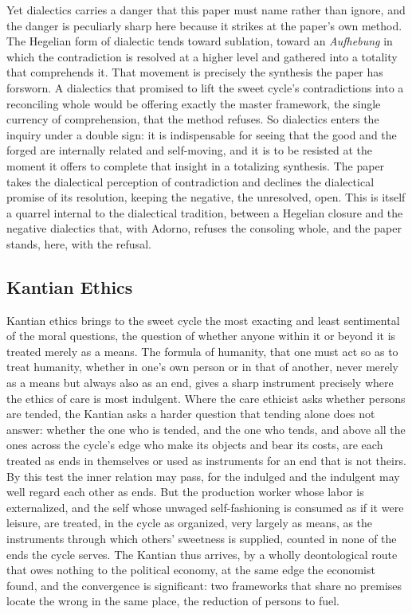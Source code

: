 \documentclass[11pt,a4paper]{article}
\begin{document}
Yet dialectics carries a danger that this paper must name rather than ignore, and the danger is peculiarly sharp here because it strikes at the paper's own method. The Hegelian form of dialectic tends toward sublation, toward an \textit{Aufhebung} in which the contradiction is resolved at a higher level and gathered into a totality that comprehends it. That movement is precisely the synthesis the paper has forsworn. A dialectics that promised to lift the sweet cycle's contradictions into a reconciling whole would be offering exactly the master framework, the single currency of comprehension, that the method refuses. So dialectics enters the inquiry under a double sign: it is indispensable for seeing that the good and the forged are internally related and self-moving, and it is to be resisted at the moment it offers to complete that insight in a totalizing synthesis. The paper takes the dialectical perception of contradiction and declines the dialectical promise of its resolution, keeping the negative, the unresolved, open. This is itself a quarrel internal to the dialectical tradition, between a Hegelian closure and the negative dialectics that, with Adorno, refuses the consoling whole, and the paper stands, here, with the refusal.

\subsection{Kantian Ethics}

Kantian ethics brings to the sweet cycle the most exacting and least sentimental of the moral questions, the question of whether anyone within it or beyond it is treated merely as a means. The formula of humanity, that one must act so as to treat humanity, whether in one's own person or in that of another, never merely as a means but always also as an end, gives a sharp instrument precisely where the ethics of care is most indulgent. Where the care ethicist asks whether persons are tended, the Kantian asks a harder question that tending alone does not answer: whether the one who is tended, and the one who tends, and above all the ones across the cycle's edge who make its objects and bear its costs, are each treated as ends in themselves or used as instruments for an end that is not theirs. By this test the inner relation may pass, for the indulged and the indulgent may well regard each other as ends. But the production worker whose labor is externalized, and the self whose unwaged self-fashioning is consumed as if it were leisure, are treated, in the cycle as organized, very largely as means, as the instruments through which others' sweetness is supplied, counted in none of the ends the cycle serves. The Kantian thus arrives, by a wholly deontological route that owes nothing to the political economy, at the same edge the economist found, and the convergence is significant: two frameworks that share no premises locate the wrong in the same place, the reduction of persons to fuel.
\end{document}
